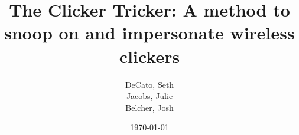 \documentclass[letterpaper,twocolumn,10pt]{article}
\begin{document}
\title{The Clicker Tricker: A method to snoop on and impersonate wireless clickers\\}
\author{
	DeCato, Seth \\
	Jacobs, Julie \\
	Belcher, Josh}



\date{\today}
\maketitle



{
  \small 
  
  
}
\end{document}
